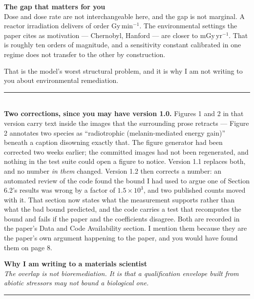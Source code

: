 \documentclass[landscape,12pt]{article}
\newcommand{\pagehead}[2]{%
  {\Large\bfseries #1}\\[1pt]
  {\small\itshape #2}\\[-4pt]
  \rule{\linewidth}{0.6pt}\\[4pt]}
\begin{document}
\begin{minipage}[t]{0.485\linewidth}
{\large\bfseries\color{prior} The gap that matters for you}\\[3pt]
Dose and dose rate are not interchangeable here, and the gap is not marginal. A reactor
irradiation delivers of order Gy\,min$^{-1}$. The environmental settings the paper cites as
motivation --- Chernobyl, Hanford --- are closer to mGy\,yr$^{-1}$. That is roughly ten orders of
magnitude, and a sensitivity constant calibrated in one regime does not transfer to the other by
construction.

\vspace{2mm}
That is the model's worst structural problem, and it is why I am not writing to you about
environmental remediation.

\vspace{4mm}
\noindent\rule{\linewidth}{0.4pt}\\[3pt]
{\small\textbf{Two corrections, since you may have version 1.0.} Figures 1 and 2 in that version
carry text inside the images that the surrounding prose retracts --- Figure 2 annotates two
species as ``radiotrophic (melanin-mediated energy gain)'' beneath a caption disowning exactly
that. The figure generator had been corrected two weeks earlier; the committed images had not
been regenerated, and nothing in the test suite could open a figure to notice. Version 1.1
replaces both, and no number \emph{in them} changed. Version 1.2 then corrects a number: an
automated review of the code found the bound I had used to argue one of Section 6.2's results was
wrong by a factor of $1.5\times10^{3}$, and two published counts moved with it. That section now
states what the measurement supports rather than what the bad bound predicted, and the code
carries a test that recomputes the bound and fails if the paper and the coefficients disagree.
Both are recorded in the paper's Data and Code Availability section. I mention them because they
are the paper's own argument happening to the paper, and you would have found them on page 8.}
\end{minipage}

\newpage
\pagehead{Why I am writing to a materials scientist}%
{The overlap is not bioremediation. It is that a qualification envelope built from abiotic
stressors may not bound a biological one.}
\end{document}

